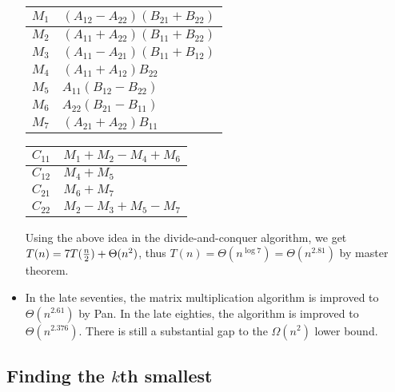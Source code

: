 \documentclass{article}
\begin{document}
\begin{itemize}
\begin{center}
\begin{tabular}{l|l}
$M_1$ & $(A_{12}-A_{22})(B_{21}+B_{22})$\\\hline
$M_2$ & $(A_{11}+A_{22})(B_{11}+B_{22})$\\\hline
$M_3$ & $(A_{11}-A_{21})(B_{11}+B_{12})$\\\hline
$M_4$ & $(A_{11}+A_{12})B_{22}$\\\hline
$M_5$ & $A_{11}(B_{12}-B_{22})$\\\hline
$M_6$ & $A_{22}(B_{21}-B_{11})$\\\hline
$M_7$ & $(A_{21}+A_{22})B_{11}$
\end{tabular}
\hskip 0.5in
\begin{tabular}{l|l}
$C_{11}$ & $M_1+M_2-M_4+M_6$\\\hline
$C_{12}$ & $M_4+M_5$\\\hline
$C_{21}$ & $M_6+M_7$\\\hline
$C_{22}$ & $M_2-M_3+M_5-M_7$\\
\end{tabular}
\end{center}

Using the above idea in the divide-and-conquer algorithm,
we get $T(n)=7T({n\over2})+\Theta(n^2)$, thus $T(n)=\Theta(n^{\log 7})
=\Theta(n^{2.81})$ by master theorem.

\item In the late seventies, the matrix multiplication algorithm is
improved to $\Theta(n^{2.61})$ by Pan. In the late eighties,
the algorithm is improved to $\Theta(n^{2.376})$. There is still
a substantial gap to the $\Omega(n^2)$ lower bound.

\end{itemize}

\subsection{Finding the $k$th smallest}

\end{document}
